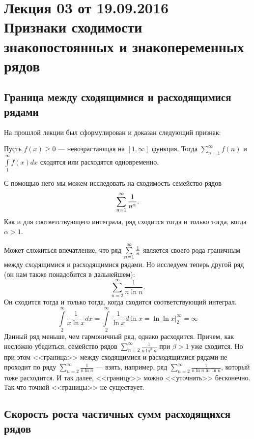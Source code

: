 \documentclass[a4paper, 12pt]{article}
\begin{document}
\pagestyle{fancy}
\section{Лекция 03 от 19.09.2016 \\Признаки сходимости знакопостоянных и знакопеременных рядов}

\subsection{Граница между сходящимися и расходящимися рядами}

На прошлой лекции был сформулирован и доказан следующий признак:
\begin{Test}

Пусть $f(x) \geqslant 0$ --- невозрастающая на $[1, \infty]$ функция. Тогда $\sum\limits_{n=1}^{\infty}f(n)$ и $\int\limits_1^{\infty}f(x)dx$ сходятся или расходятся одновременно.
\end{Test}

С помощью него мы можем исследовать на сходимость семейство рядов
$$
\sum\limits_{n=1}^{\infty} \frac{1}{n^\alpha}.
$$
Как и для соответствующего интеграла, ряд сходится тогда и только тогда, когда $\alpha > 1$.

Может сложиться впечатление, что ряд $\sum\limits_{n=1}^{\infty} \frac{1}{n}$ является своего рода граничным между сходящимися и расходящимися рядами. Но исследуем теперь другой ряд (он нам также понадобится в дальнейшем):
$$
\sum\limits_{n=2}^{\infty} \frac{1}{n\ln n}.
$$
Он сходится тогда и только тогда, когда сходится соответствующий интеграл.
$$
\int\limits_{2}^{\infty} \frac{1}{x\ln x}dx = \int\limits_{2}^{\infty} \frac{1}{\ln x} d\ln x = \ln\ln x \Big|_2^{\infty} = \infty
$$
Данный ряд меньше, чем гармоничный ряд, однако расходится. Причем, как несложно убедиться, семейство рядов $\sum\limits_{n=2}^{\infty}\frac{1}{n\ln^\beta n}$ при $\beta > 1$ уже сходится. Но при этом <<граница>> между сходящимися и расходящимися рядами не проходит по ряду $\sum\limits_{n=2}^{\infty} \frac{1}{n\ln n}$ --- взять, например, ряд $\sum\limits_{n=2}^{\infty}\frac{1}{n\ln n \ln\ln n}$, который тоже расходится. И так далее, <<границу>> можно <<уточнять>> бесконечно. Так что точной <<границы>> не существует.

\subsection{Скорость роста частичных сумм расходящихся рядов}
\end{document}
